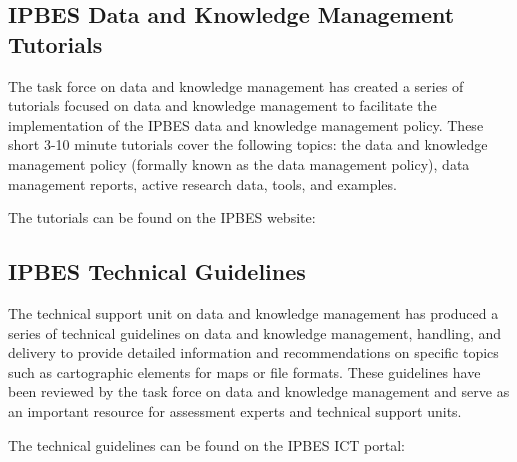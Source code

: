\documentclass{article}
\begin{document}
\subsection{IPBES Data and Knowledge Management Tutorials}

The task force on data and knowledge management has created a series of tutorials focused on data and knowledge management to facilitate the implementation of the IPBES data and knowledge management policy. These short 3-10 minute tutorials cover the following topics: the data and knowledge management policy (formally known as the data management policy), data management reports, active research data, tools, and examples.

The tutorials can be found on the IPBES website:

\subsection{IPBES Technical Guidelines}

The technical support unit on data and knowledge management has produced a series of technical guidelines on data and knowledge management, handling, and delivery to provide detailed information and recommendations on specific topics such as cartographic elements for maps or file formats. These guidelines have been reviewed by the task force on data and knowledge management and serve as an important resource for assessment experts and technical support units.

The technical guidelines can be found on the IPBES ICT portal:
\end{document}
